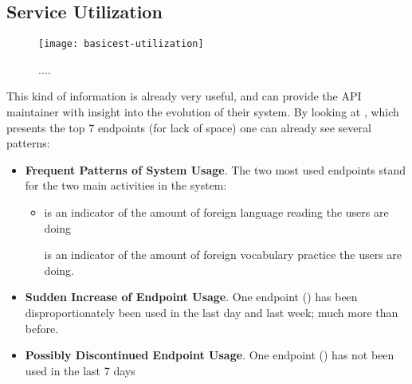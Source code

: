 

\newpage
\subsection{Service Utilization}
\label{sec:util}




  \begin{figure}[h!]
  \centering
  \texttt{[image: basicest-utilization]}
  \caption{....}
  \label{fig:basicest}
  \end{figure}

This kind of information is already very useful, and can provide the API maintainer with insight into the evolution of their system. By looking at , which presents the top 7 endpoints (for lack of space) one can already see several patterns: 

\begin{itemize}

  \item {\bf Frequent Patterns of System Usage}. The two most used endpoints stand for the two main activities in the system: 

  \begin{itemize}

    \item \epTranslations is an indicator of the amount of foreign language reading the users are doing

    \epOutcome is an indicator of the amount of foreign vocabulary practice the users are doing.

  \end{itemize}

  \item {\bf Sudden Increase of Endpoint Usage}. One endpoint (\epUserActivity) has been disproportionately been used in the last day and last week; much more than before. 

  \item {\bf Possibly Discontinued Endpoint Usage}. One endpoint (\epFeedItems) has not been used in the last 7 days

\end{itemize}

